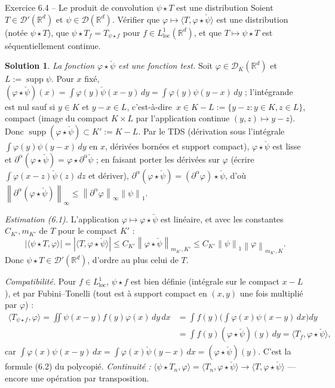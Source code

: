 \documentclass[11pt,a4paper]{article}
\newcommand{\R}{\mathbb{R}}
\newcommand{\norm}[1]{\left\|#1\right\|}
\newcommand{\ie}{c'est-à-dire}
\DeclareMathOperator{\supp}{supp}
\newcommand{\D}{\mathcal{D}}
\theoremstyle{definition}
\newtheorem*{solution}{Solution}
\begin{document}
\begin{exo}{Exercice 6.4 -- Le produit de convolution $\psi\star T$ est une distribution}
Soient $T\in\D'(\R^d)$ et $\psi\in\D(\R^d)$. Vérifier que $\varphi\mapsto\langle T,\varphi\star\check\psi\rangle$ est une distribution (notée $\psi\star T$), que $\psi\star T_f=T_{\psi\star f}$ pour $f\in L^1_{\mathrm{loc}}(\R^d)$, et que $T\mapsto\psi\star T$ est séquentiellement continue.
\end{exo}

\begin{solution}
\emph{La fonction $\varphi\star\check\psi$ est une fonction test.} Soit $\varphi\in\D_K(\R^d)$ et $L:=\supp\psi$. Pour $x$ fixé, $(\varphi\star\check\psi)(x)=\int\varphi(y)\check\psi(x-y)\,dy=\int\varphi(y)\psi(y-x)\,dy$ ; l'intégrande est nul sauf si $y\in K$ et $y-x\in L$, \ie\ $x\in K-L:=\{y-z:y\in K,z\in L\}$, compact (image du compact $K\times L$ par l'application continue $(y,z)\mapsto y-z$). Donc $\supp(\varphi\star\check\psi)\subset K':=K-L$. Par le TDS (dérivation sous l'intégrale $\int\varphi(y)\psi(y-x)\,dy$ en $x$, dérivées bornées et support compact), $\varphi\star\check\psi$ est lisse et $\partial^\alpha(\varphi\star\check\psi)=\varphi\star\partial^\alpha\check\psi$ ; en faisant porter les dérivées sur $\varphi$ (écrire $\int\varphi(x-z)\check\psi(z)\,dz$ et dériver), $\partial^\alpha(\varphi\star\check\psi)=(\partial^\alpha\varphi)\star\check\psi$, d'où $\norm{\partial^\alpha(\varphi\star\check\psi)}_\infty\le\norm{\partial^\alpha\varphi}_\infty\norm\psi_1$.

\emph{Estimation (6.1).} L'application $\varphi\mapsto\varphi\star\check\psi$ est linéaire, et avec les constantes $C_{K'},m_{K'}$ de $T$ pour le compact $K'$ :
\[
|\langle\psi\star T,\varphi\rangle|=|\langle T,\varphi\star\check\psi\rangle|\le C_{K'}\norm{\varphi\star\check\psi}_{m_{K'},K'}\le C_{K'}\norm\psi_1\norm\varphi_{m_{K'},K}.
\]
Donc $\psi\star T\in\D'(\R^d)$, d'ordre au plus celui de $T$.

\emph{Compatibilité.} Pour $f\in L^1_{\mathrm{loc}}$, $\psi\star f$ est bien définie (intégrale sur le compact $x-L$), et par Fubini--Tonelli (tout est à support compact en $(x,y)$ une fois multiplié par $\varphi$) :
\begin{align*}
\langle T_{\psi\star f},\varphi\rangle=\iint\psi(x-y)f(y)\varphi(x)\,dy\,dx&=\int f(y)\Big(\int\varphi(x)\psi(x-y)\,dx\Big)dy\\&=\int f(y)(\varphi\star\check\psi)(y)\,dy=\langle T_f,\varphi\star\check\psi\rangle,
\end{align*}
car $\int\varphi(x)\psi(x-y)\,dx=\int\varphi(x)\check\psi(y-x)\,dx=(\varphi\star\check\psi)(y)$. C'est la formule (6.2) du polycopié. \emph{Continuité :} $\langle\psi\star T_n,\varphi\rangle=\langle T_n,\varphi\star\check\psi\rangle\to\langle T,\varphi\star\check\psi\rangle$ — encore une opération par transposition.
\end{solution}
\end{document}
